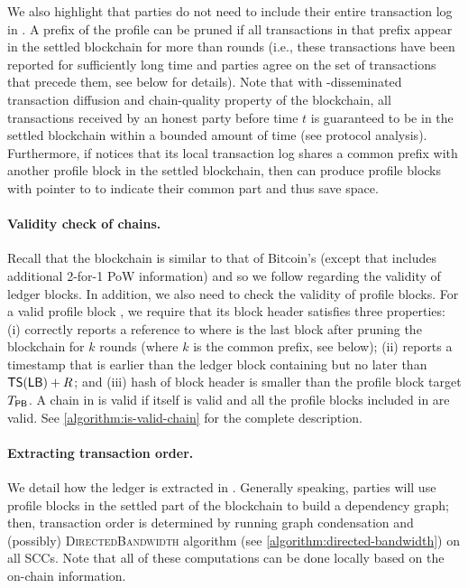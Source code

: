 We also highlight that parties do not need to include their entire transaction log in \PB.
%
A prefix of the profile can be pruned if all transactions in that prefix appear in the settled blockchain for more than \PBWindowLen rounds (i.e., these transactions have been reported for sufficiently long time and parties agree on the set of transactions that precede them, see below for details).
%
Note that with \txDelay-disseminated transaction diffusion and chain-quality property of the blockchain, all transactions received by an honest party before time $t$ is guaranteed to be in the settled blockchain within a bounded amount of time (see protocol analysis).
%
Furthermore, if \party notices that its local transaction log shares a common prefix with another profile block \PB in the settled blockchain, then \party can produce profile blocks with pointer to \PB to indicate their common part and thus save space.



\paragraph{Validity check of chains.}
%
Recall that the \Taxis blockchain is similar to that of Bitcoin's (except that \Taxis includes additional 2-for-1 PoW information) and so we follow \cite{C:GarKiaLeo17} regarding the validity of ledger blocks.
%
In addition, we also need to check the validity of profile blocks.
%
For a valid profile block \PB, we require that its block header satisfies three properties:
%
(i) \PB correctly reports a reference to \LB where \LB is the last block after pruning the blockchain for $k$ rounds (where $k$ is the common prefix, see below);
%
(ii) \PB reports a timestamp that is earlier than the ledger block containing \PB but no later than $\mathsf{TS}(\mathsf{LB}) + R$;
%
and (iii) hash of \PB block header is smaller than the profile block target $T_\mathsf{PB}$.
%
A chain \chain in \Taxis is valid if \chain itself is valid and all the profile blocks included in \chain are valid.
%
See \cref{algorithm:is-valid-chain} for the complete description.



\paragraph{Extracting transaction order.}
%
We detail how the ledger \ledger is extracted in \TaxisWL.
%
Generally speaking, parties will use profile blocks in the settled part of the blockchain to build a dependency graph; then, transaction order is determined by running graph condensation and (possibly) \textsc{DirectedBandwidth} algorithm (see \cref{algorithm:directed-bandwidth}) on all SCCs.
%
Note that all of these computations can be done locally based on the on-chain information.


